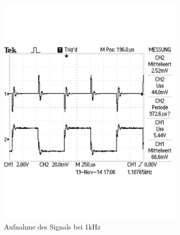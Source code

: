 \documentclass[12pt,a4paper]{article}
\begin{document}
\begin{figure}[H]
\begin{subfigure}[b]{0.28\textwidth}
                \includegraphics[width=\textwidth , scale = 0.4]{2_5_recht_1k.pdf}
                \caption[Aufnahme des Signals bei 1kHz]{Aufnahme des Signals bei 1kHz}
                \label{fig:2_5_recht_1k}
        \end{subfigure}
        \hfill
        \begin{subfigure}[b]{0.28\textwidth}

\end{subfigure}
\end{figure}
\end{document}
